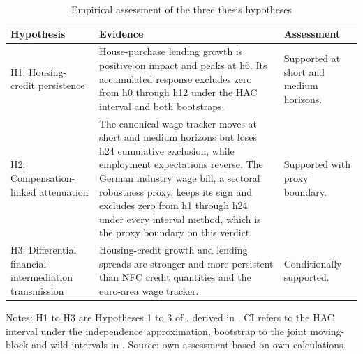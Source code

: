 \begin{table}[htbp]
  \centering
  \caption{Empirical assessment of the three thesis hypotheses}
  \label{tab:hypothesis-assessment}
  \small
  \setlength{\tabcolsep}{5pt}
  \begin{tabularx}{\textwidth}{@{}>{\raggedright\arraybackslash}p{}>{\raggedright\arraybackslash}X>{\raggedright\arraybackslash}p{}@{}}
    \toprule
    Hypothesis & Evidence & Assessment \\
    \midrule
    H1: Housing-credit persistence & House-purchase lending growth is positive on impact and peaks at h6. Its accumulated response excludes zero from h0 through h12 under the HAC interval and both bootstraps. & Supported at short and medium horizons. \\
    H2: Compensation-linked attenuation & The canonical wage tracker moves at short and medium horizons but loses h24 cumulative exclusion, while employment expectations reverse. The German industry wage bill, a sectoral robustness proxy, keeps its sign and excludes zero from h1 through h24 under every interval method, which is the proxy boundary on this verdict. & Supported with proxy boundary. \\
    H3: Differential financial-intermediation transmission & Housing-credit growth and lending spreads are stronger and more persistent than NFC credit quantities and the euro-area wage tracker. & Conditionally supported. \\
    \bottomrule
  \end{tabularx}
  \vspace{0.25em}
  {\footnotesize Notes: H1 to H3 are Hypotheses 1 to 3 of , derived in . CI refers to the HAC interval under the independence approximation, bootstrap to the joint moving-block and wild intervals in . Source: own assessment based on own calculations.}
\end{table}
